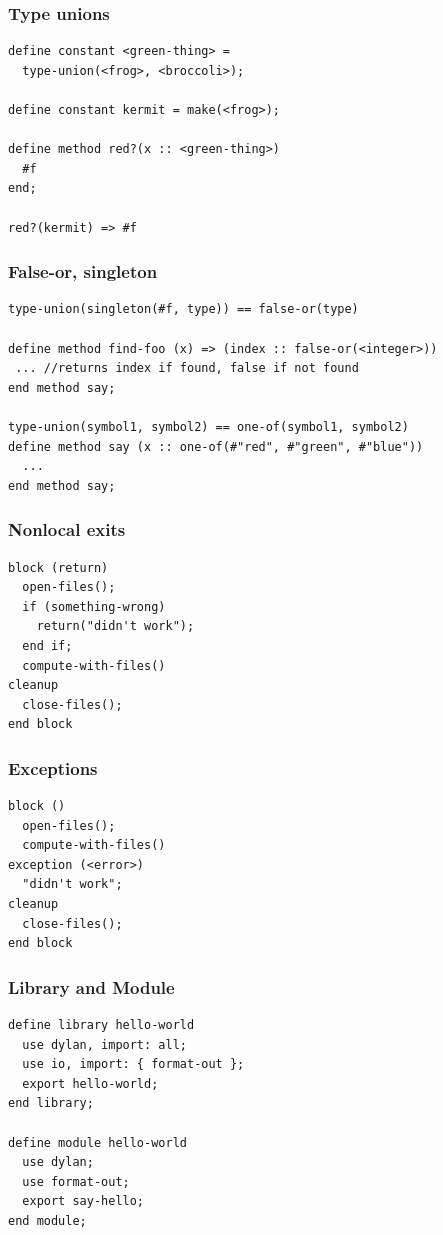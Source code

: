 \documentclass[compress]{beamer}
\begin{document}
\begin{frame}[fragile]
  \frametitle{Type unions}
  \begin{verbatim}
define constant <green-thing> =
  type-union(<frog>, <broccoli>);

define constant kermit = make(<frog>);

define method red?(x :: <green-thing>)
  #f
end;

red?(kermit) => #f
  \end{verbatim}
\end{frame}

\begin{frame}[fragile]
  \frametitle{False-or, singleton}
  \begin{verbatim}
type-union(singleton(#f, type)) == false-or(type)

define method find-foo (x) => (index :: false-or(<integer>))
 ... //returns index if found, false if not found
end method say;

type-union(symbol1, symbol2) == one-of(symbol1, symbol2)
define method say (x :: one-of(#"red", #"green", #"blue"))
  ...
end method say;
  \end{verbatim}
\end{frame}


\begin{frame}[fragile]
  \frametitle{Nonlocal exits}
  \begin{verbatim}
block (return)
  open-files();
  if (something-wrong)
    return("didn't work");
  end if;
  compute-with-files()
cleanup
  close-files();
end block
  \end{verbatim}
\end{frame}

\begin{frame}[fragile]
  \frametitle{Exceptions}
  \begin{verbatim}
block ()
  open-files();
  compute-with-files()
exception (<error>) 
  "didn't work";
cleanup
  close-files();
end block
  \end{verbatim}
\end{frame}

\begin{frame}[fragile]
  \frametitle{Library and Module}
  \begin{verbatim}
define library hello-world
  use dylan, import: all;
  use io, import: { format-out };
  export hello-world;
end library;

define module hello-world
  use dylan;
  use format-out;
  export say-hello;
end module;
  \end{verbatim}
\end{frame}
\end{document}
